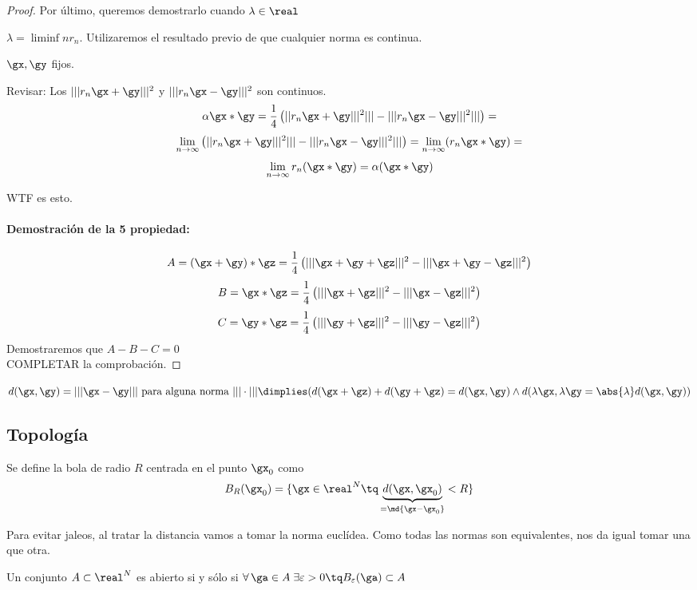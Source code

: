 \documentclass{apuntes}
\begin{document}
\begin{proof}
Por último, queremos demostrarlo cuando $\lambda \in \real$

$\lambda = \liminf{n} r_n$. Utilizaremos el resultado previo de que cualquier norma es continua.

$\gx, \gy$ fijos.

Revisar: Los $|||r_n \gx + \gy|||^2$ y  $|||r_n \gx - \gy|||^2$ son continuos.
$$\alpha \gx*\gy = \frac{1}{4}\left(||r_n \gx + \gy|||^2||| -|||r_n \gx - \gy|||^2||| \right) =$$
$$\lim_{n\to\infty} \left(||r_n \gx + \gy|||^2||| -|||r_n \gx - \gy|||^2||| \right) = \lim_{n\to\infty} (r_n\gx*\gy) = $$
$$\lim_{n\to\infty} r_n(\gx*\gy) = \alpha (\gx*\gy)$$

WTF es esto.

\paragraph{Demostración de la 5 propiedad:}
$$A = (\gx+\gy)*\gz = \frac{1}{4} \left( |||\gx+\gy+\gz|||^2 - |||\gx+\gy-\gz|||^2\right)$$
$$B =\gx*\gz = \frac{1}{4} \left( |||\gx+\gz|||^2 - |||\gx-\gz|||^2\right)$$
$$C =\gy*\gz = \frac{1}{4} \left( |||\gy+\gz|||^2 - |||\gy-\gz|||^2\right)$$
Demostraremos que $A-B-C=0$\\
COMPLETAR la comprobación.
\end{proof}
\begin{remark}
$d(\gx,\gy) = |||\gx-\gy||| \text{ para alguna norma }|||\cdot||| \dimplies (d(\gx+\gz)+d(\gy+\gz) = d(\gx,\gy) \wedge d(\lambda \gx,\lambda \gy = \abs{\lambda} d(\gx,\gy))$
\end{remark}

\subsection{Topología}
\begin{defn}[Bola] Se define la bola de radio $R$ centrada en el punto $\gx_0$ como 
\[B_R(\gx_0) =\{\gx \in \real^N \tq \underbrace{d(\gx,\gx_0)}_{=\md{\gx-\gx_0}} < R \} \]
\end{defn}


Para evitar jaleos, al tratar la distancia vamos a tomar la norma euclídea. Como todas las normas son equivalentes, nos da igual tomar una que otra.
\begin{defn} Un conjunto $A \subset \real^N$ es abierto si y sólo si $\forall\, \ga\in A\; \exists \varepsilon > 0 \tq B_\varepsilon(\ga) \subset A$
\end{defn}
\end{document}

